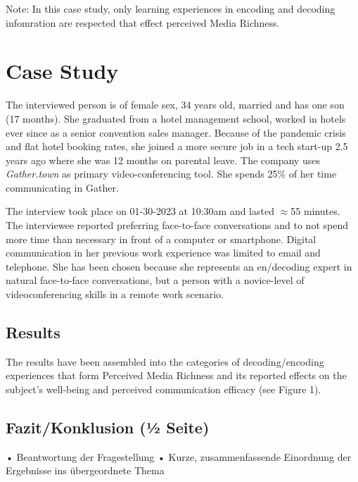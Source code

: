 \documentclass[man]{apa7}
\begin{document}
Note: In this case study, only learning experiences in encoding and decoding infomration are respected that effect perceived Media Richness.

\section{Case Study}

The interviewed person is of female sex, 34 years old, married and has one son (17 months). She graduated from a hotel management school, worked in hotels ever since as a senior convention sales manager. Because of the pandemic crisis and flat hotel booking rates, she joined a more secure job in a tech start-up 2.5 years ago where she was 12 months on parental leave. The company uses \textit{Gather.town} as primary video-conferencing tool. She spends 25\% of her time communicating in Gather.

The interview took place on 01-30-2023 at 10:30am and lasted $\approx$55 minutes. The interviewee reported preferring face-to-face conversations and to not spend more time than necessary in front of a computer or smartphone. Digital communication in her previous work experience was limited to email and telephone. She has been chosen because she represents an en/decoding expert in natural face-to-face conversations, but a person with a novice-level of videoconferencing skills in a remote work scenario. 

\subsection{Results}

The results have been assembled into the categories of decoding/encoding experiences that form Perceived Media Richness and its reported effects on the subject's well-being and perceived communication efficacy (see Figure 1).

\subsection{Fazit/Konklusion (1⁄2 Seite)}
• Beantwortung der Fragestellung
• Kurze, zusammenfassende Einordnung der Ergebnisse ins übergeordnete Thema

\printbibliography

\appendix
\end{document}
